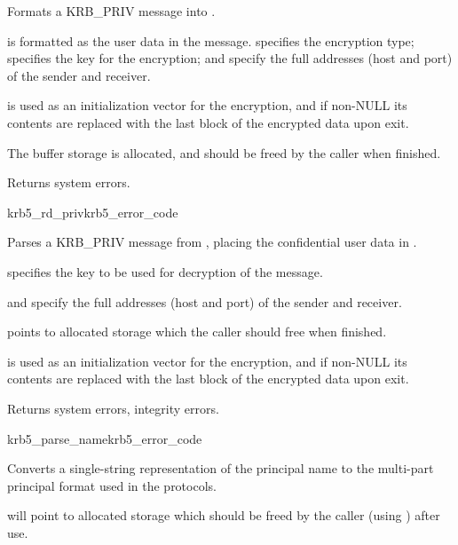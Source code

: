 Formats a KRB_PRIV message into .

 is formatted as the user data in the message.
 specifies the encryption type; 
specifies the key for the encryption;  and
 specify the full addresses (host and port) of the
sender and receiver.

 is used as an initialization vector for the
encryption, and if non-NULL its contents are replaced with the last
block of the encrypted data upon exit.

The  buffer storage is allocated, and should be freed by the
caller when finished.

Returns system errors.

\begin{funcdecl}{krb5_rd_priv}{krb5_error_code}{\funcin}
\funcinout
{}
\funcout
{}
\end{funcdecl}

Parses a KRB_PRIV message from , placing the confidential user
data in .

 specifies the key to be used for decryption of the message.
 
 and  specify the full
addresses (host and port) of the sender and receiver.

 points to allocated storage which the caller should
free when finished.

 is used as an initialization vector for the
encryption, and if non-NULL its contents are replaced with the last
block of the encrypted data upon exit.

Returns system errors, integrity errors.

\begin{funcdecl}{krb5_parse_name}{krb5_error_code}{\funcin}
\funcout
{}
\end{funcdecl}

Converts a single-string representation  of the
principal name to the multi-part principal format used in the protocols.

 will point to allocated storage which should be freed by
the caller (using ) after use.

